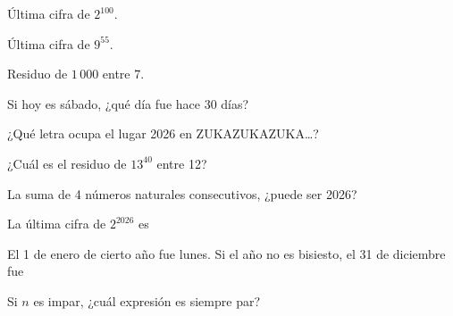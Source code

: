 \taller
{}
\begin{ejercicios}[2]
\item Última cifra de $2^{100}$. 
\item Última cifra de $9^{55}$. 
\item Residuo de $1\,000$ entre 7. 
\item Si hoy es sábado, ¿qué día fue hace 30 días? 
\end{ejercicios}
\begin{ejercicios}
\item ¿Qué letra ocupa el lugar 2026 en ZUKAZUKAZUKA…? 
\item ¿Cuál es el residuo de $13^{40}$ entre 12? 
\item La suma de 4 números naturales consecutivos, ¿puede ser 2026? 
\end{ejercicios}
\begin{ejercicios}
\item La última cifra de $2^{2026}$ es
\item El 1 de enero de cierto año fue lunes. Si el año no es bisiesto, el 31 de diciembre fue
\item Si $n$ es impar, ¿cuál expresión es siempre par?
\end{ejercicios}

\bitacora

